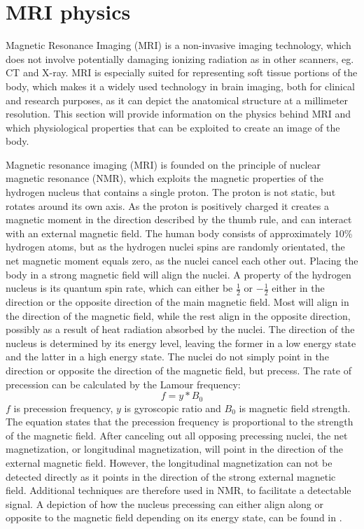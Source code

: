 \section{MRI physics} \label{sec:physics}

Magnetic Resonance Imaging (MRI) is a non-invasive imaging technology, which does not involve potentially damaging ionizing radiation as in other scanners, eg. CT and X-ray. MRI is especially suited for representing soft tissue portions of the body, which makes it a widely used technology in brain imaging, both for clinical and research purposes, as it can depict the anatomical structure at a millimeter resolution. This section will provide information on the physics behind MRI and which physiological properties that can be exploited to create an image of the body.
 
Magnetic resonance imaging (MRI) is founded on the principle of nuclear magnetic resonance (NMR), which exploits the magnetic properties of the hydrogen nucleus that contains a single proton. The proton is not static, but rotates around its own axis. As the proton is positively charged it creates a magnetic moment in the direction described by the thumb rule, and can interact with an external magnetic field. The human body consists of approximately 10\% hydrogen atoms, but as the hydrogen nuclei spins are randomly orientated, the net magnetic moment equals zero, as the nuclei cancel each other out. Placing the body in a strong magnetic field will align the nuclei. A property of the hydrogen nucleus is its quantum spin rate, which can either be $ \frac{1}{2}$ or $- \frac{1}{2}$ either in the direction or the opposite direction of the main magnetic field. Most will align in the direction of the magnetic field, while the rest align in the opposite direction, possibly as a result of heat radiation absorbed by the nuclei. The direction of the nucleus is determined by its energy level, leaving the former in a low energy state and the latter in a high energy state. The nuclei do not simply point in the direction or opposite the direction of the magnetic field, but precess. \cite{Bharath2008} The rate of precession can be calculated by the Lamour frequency:
\begin{equation} \label{eq:lamour}
f=y*B_0
\end{equation} 
$f$ is precession frequency, $y$ is gyroscopic ratio and $B_0$ is magnetic field strength. The equation states that the precession frequency is proportional to the strength of the magnetic field. After canceling out all opposing precessing nuclei, the net magnetization, or longitudinal magnetization, will point in the direction of the external magnetic field. However, the longitudinal magnetization can not be detected directly as it points in the direction of the strong external magnetic field. Additional techniques are therefore used in NMR, to facilitate a detectable signal. \cite{Bharath2008} A depiction of how the nucleus precessing can either align along or opposite to the magnetic field depending on its energy state, can be found in .  \\


